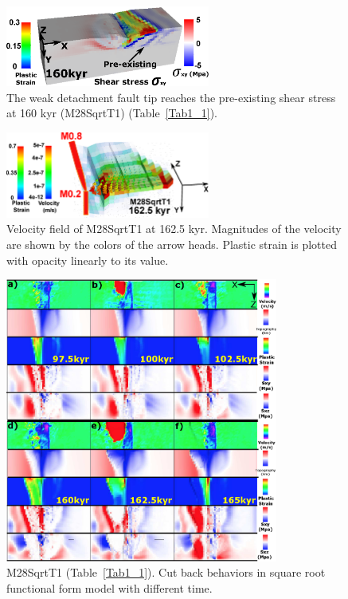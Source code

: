 \begin{figure}[h]
  \centering
    \includegraphics[width=0.6\textwidth]{./Figures/fig_Results4_5_sqrt_cut_back_pre_accummulated_shear_zone.eps}
  \caption{The weak detachment fault tip reaches the pre-existing shear stress at 160 kyr (M28SqrtT1) (Table~\hyperref[Tab1_1]{\ref{Tab1_1}}).}
 \label{fig_Results4_5}
\end{figure}   

\begin{figure}[h]
  \centering
    \includegraphics[width=0.6\textwidth]{./Figures/fig_Results_3_2_5_Cut-back_velocity.eps}
  \caption{Velocity field of M28SqrtT1 at 162.5 kyr. Magnitudes of the velocity are shown by the colors of the arrow heads. Plastic strain is plotted with opacity linearly to its value.}
 \label{fig_Results_3_2_5_Cut-back_velocity}
\end{figure}   

\begin{figure}[h]
  \centering
    \includegraphics[width=0.8\textwidth]{./Figures/fig_Results4_4_sqrt_cut_back_with_time.eps}
  \caption{M28SqrtT1 (Table~\hyperref[Tab1_1]{\ref{Tab1_1}}). Cut back behaviors in square root functional form model with different time.}
 \label{fig_Results4_4}
\end{figure}   

